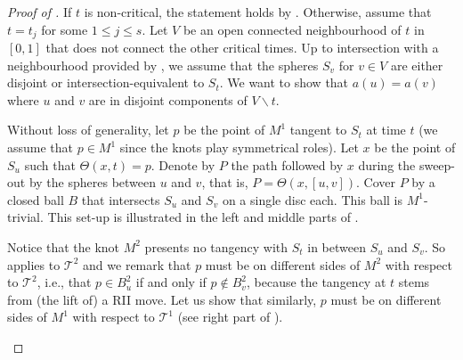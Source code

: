 \documentclass[10pt,a4paper]{amsart}
\newcommand{\T}{\mathcal{T}}
\begin{document}
\begin{proof}[Proof of ]
If $t$ is non-critical, the statement holds by . Otherwise, assume that $t = t_j$ for some $1\leq j \leq s$. Let $V$ be an open connected neighbourhood of $t$ in $[0,1]$ that does not connect the other critical times. Up to intersection with a neighbourhood provided by , we assume that the spheres $S_v$ for $v \in V$ are either disjoint or intersection-equivalent to $S_t$. We want to show that $a(u)= a(v)$ where $u$ and $v$ are in disjoint components of $V \smallsetminus t$.

Without loss of generality, let $p$ be the point of $M^1$ tangent to $S_t$ at time $t$ (we assume that $p \in M^1$ since the knots play symmetrical roles). Let $x$ be the point of $S_u$ such that $\Theta(x, t) =p$. Denote by $P$ the path followed by $x$ during the sweep-out by the spheres between $u$ and $v$, that is, $P = \Theta (x, [u,v])$. Cover $P$ by a closed ball $B$ that intersects $S_u$ and $S_v$ on a single disc each. This ball is $M^1$-trivial. This set-up is illustrated in the left and middle parts of .

Notice that the knot $M^2$ presents no tangency with $S_t$ in between $S_u$ and $S_v$. So  applies to $\T^2$ and we remark that $p$ must be on different sides of $M^2$ with respect to $\T^2$, i.e., that $p \in B^2_u$ if and only if $p \not \in B^2_v$, because the tangency at $t$ stems from (the lift of) a RII move. Let us show that similarly, $p$ must be on different sides of $M^1$ with respect to $\T^1$ (see right part of ).

\begin{figure}[ht]
\begin{center}
\end{center}
\end{figure}
\end{proof}
\end{document}
